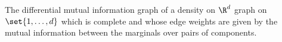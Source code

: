 

The differential mutual information graph
of a density on $\R^d$
graph on $\set{1, \dots, d}$
which is complete and whose
edge weights are given by the mutual
information between the marginals
over pairs of components.


